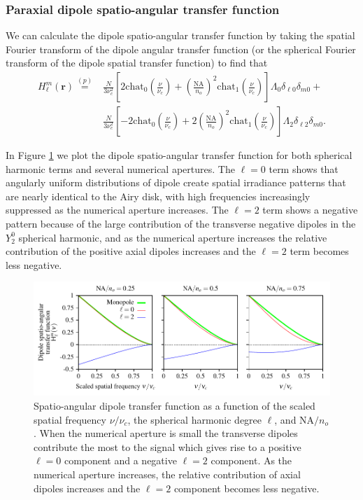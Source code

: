 \documentclass[]{osa-article}
\providecommand{\mb}[1]{\mathbf{#1}}
\begin{document}
 \subsubsection{Paraxial dipole spatio-angular transfer function}
 We can calculate the dipole spatio-angular transfer function by taking the
 spatial Fourier transform of the dipole angular transfer function (or the
 spherical Fourier transform of the dipole spatial transfer function) to find
 that
 \begin{align}
H_{\ell}^m(\mb{r}) \stackrel{(p)}{=} &\frac{N}{3\nu_c^2}\left[2\text{chat}_0\left(\frac{\nu}{\nu_c}\right) + \left(\frac{\text{NA}}{n_o}\right)^2\text{chat}_1\left(\frac{\nu}{\nu_c}\right)\right]\Lambda_0\delta_{\ell0}\delta_{m0}+\nonumber\\ &\frac{N}{3\nu_c^2}\left[-2\text{chat}_0\left(\frac{\nu}{\nu_c}\right) + 2\left(\frac{\text{NA}}{n_o}\right)^2\text{chat}_1\left(\frac{\nu}{\nu_c}\right)\right]\Lambda_2\delta_{\ell2}\delta_{m0}.
 \end{align}

 In Figure \ref{fig:dsatf} we plot the dipole spatio-angular transfer function
 for both spherical harmonic terms and several numerical apertures. The $\ell=0$
 term shows that angularly uniform distributions of dipole create spatial
 irradiance patterns that are nearly identical to the Airy disk, with high
 frequencies increasingly suppressed as the numerical aperture increases. The
 $\ell=2$ term shows a negative pattern because of the large contribution of the
 transverse negative dipoles in the $Y_2^0$ spherical harmonic, and as the
 numerical aperture increases the relative contribution of the positive axial
 dipoles increases and the $\ell=2$ term becomes less negative.
 
\begin{figure}[h]
 \centering
   \centering
   \includegraphics[scale=0.8]{../figures/paratfs/satf.pdf}
   \caption{Spatio-angular dipole transfer function as a function of the scaled
     spatial frequency $\nu/\nu_c$, the spherical harmonic degree $\ell$, and
     $\text{NA}/n_o$. When the numerical aperture is small the transverse
     dipoles contribute the most to the signal which gives rise to a positive
     $\ell=0$ component and a negative $\ell=2$ component. As the numerical
     aperture increases, the relative contribution of axial dipoles increases
     and the $\ell=2$ component becomes less negative.}
   \label{fig:dsatf}
 \end{figure}
\end{document}
